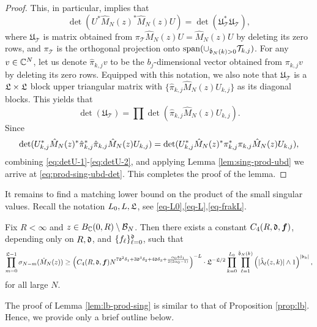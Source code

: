 \documentclass{amsart}
\numberwithin{equation}{section}
\def\corEE{\textcolor{amethyst}}
\def\corEE{}
\def\corAB{}
\def\corOZ{}
\def\corABrev{\textcolor{black}}
\begin{document}
\begin{proof}
This, in particular, implies that
\begin{equation}\label{eq:detU-1}
\det(U^*\hat{M}_N(z)^* \hat{M}_N(z) U)= \det(\mathfrak{U}^*_{\mathcal{T}} \mathfrak{U}_{\mathcal{T}}),
\end{equation}
where $\mathfrak{U}_{\mathcal{T}}$ is matrix obtained from $\pi_{\mathcal{T}} \hat{M}_N(z) U=\hat{M}_N(z) U$ by deleting its zero rows, and $\pi_{\mathcal{T}}$ is the orthogonal projection onto $\operatorname{span}(\cup_{\hat{\mathfrak{d}}_N(k)>0} \mathcal{T}_{k,j})$. For any $v \in \mathbb{C}^N$, let us denote $\hat{\pi}_{k,j} v$ to be the $b_j$-dimensional vector obtained from ${\pi}_{k,j} v$ by deleting its zero rows. Equipped with this notation, we also note that $\mathfrak{U}_{\mathcal{T}}$ is a $\mathfrak{L} \times \mathfrak{L}$ block upper triangular matrix with $\{\hat\pi_{k,j} \hat{M}_N(z) U_{k,j}\}$ as its diagonal blocks. This yields that
\begin{equation}\label{eq:detU-2}
\det(\mathfrak{U}_{\mathcal{T}}) = \prod \det(\hat{\pi}_{k,j} \hat{M}_N(z) U_{k,j}).
\end{equation}
Since
\begin{equation}
\det(U_{k,j}^*\hat{M}_N(z)^* \hat{\pi}_{k,j}^*\hat{\pi}_{k,j} \hat{M}_N(z) U_{k,j})= \det(U_{k,j}^*\hat{M}_N(z)^* {\pi}_{k,j}^*{\pi}_{k,j} \hat{M}_N(z) U_{k,j}), \notag
\end{equation}
combining \eqref{eq:detU-1}-\eqref{eq:detU-2}, and applying Lemma \ref{lem:sing-prod-ubd} we arrive at \eqref{eq:prod-sing-ubd-det}. This completes the proof of the lemma.
\end{proof}
It remains to find a matching lower bound on the product of the small singular values.
\corOZ{Recall the notation $L_0,L,\mathfrak{L}$, see \eqref{eq-L0},\eqref{eq-L},\eqref{eq-frakL}.}
\begin{lemma}  \label{lem:lb-prod-sing}
Fix $R<\infty$ and $z \in B_{\mathbb{C}}(0,R) \setminus \mathcal{B}_N$. Then there exists a constant $C_4(R,\mathfrak{d}, {\bm f})$, depending only on $R, \mathfrak{d}$, and $\{f_{\ell}\}_{\ell=0}^{\mathfrak{d}}$, such that
  \[
    \prod_{m=0}^{\gL-1} \sigma_{N-m}(\hat{M}_N(z))
    \geq
    \left(C_4(R,\gd, {\bm f}) N^{7\gd^2 \delta_1+3\corEE{\gd}^3\delta_2+4\gd \delta_3+\corABrev{\frac{\alpha_0\gd \delta_1}{2(2\alpha_0-1)}}}\right)^{-L} \cdot \gL^{-\gL/2}
    \prod_{k=0}^{L_0} \prod_{\ell=1}^{\hat\gd_N(k)} \left(|\hat{\lambda}_\ell(z,k)| \wedge 1\right)^{|\gb_k|},
  \]
for all large $N$.
\end{lemma}

\corAB{The proof of Lemma \ref{lem:lb-prod-sing} is similar to that of Proposition \ref{prop:lb}. Hence, we provide only a brief outline below.}
\end{document}
